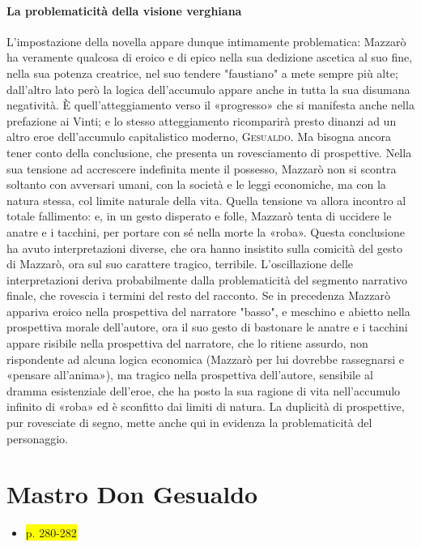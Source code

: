 \documentclass{book}
\newcommand{\pagine}[1]{\colorbox{yellow}{#1}}
\begin{document}
\paragraph{La problematicità della visione verghiana}

L'impostazione della novella appare dunque intimamente problematica: Mazzarò ha veramente qualcosa di eroico e di epico nella sua dedizione ascetica al suo fine, nella sua potenza creatrice, nel suo tendere "faustiano" a mete sempre più alte; dall'altro lato però la logica dell'accumulo appare anche in tutta la sua disumana negatività. È quell'atteggiamento verso il «progresso» che si manifesta anche nella prefazione ai Vinti; e lo stesso atteggiamento ricomparirà presto dinanzi ad un altro eroe dell'accumulo capitalistico moderno, \textsc{Gesualdo}. Ma bisogna ancora tener conto della conclusione, che presenta un rovesciamento di prospettive. Nella sua tensione ad accrescere indefinita mente il possesso, Mazzarò non si scontra soltanto con avversari umani, con la società e le leggi economiche, ma con la natura stessa, col limite naturale della vita. Quella tensione va allora incontro al totale fallimento: e, in un gesto disperato e folle, Mazzarò tenta di uccidere le anatre e i tacchini, per portare con sé nella morte la «roba». Questa conclusione ha avuto interpretazioni diverse, che ora hanno insistito sulla comicità del gesto di Mazzarò, ora sul suo carattere tragico, terribile. L'oscillazione delle interpretazioni deriva probabilmente dalla problematicità del segmento narrativo finale, che rovescia i termini del resto del racconto. Se in precedenza Mazzarò appariva eroico nella prospettiva del narratore "basso", e meschino e abietto nella prospettiva morale dell'autore, ora il suo gesto di bastonare le anatre e i tacchini appare risibile nella prospettiva del narratore, che lo ritiene assurdo, non rispondente ad alcuna logica economica (Mazzarò per lui dovrebbe rassegnarsi e «pensare all'anima»), ma tragico nella prospettiva dell'autore, sensibile al dramma esistenziale dell'eroe, che ha posto la sua ragione di vita nell'accumulo infinito di «roba» ed è sconfitto dai limiti di natura. La duplicità di prospettive, pur rovesciate di segno, mette anche qui in evidenza la problematicità del personaggio.

\section{Mastro Don Gesualdo}

\begin{itemize}
\item
  \pagine{p. 280-282}
\end{itemize}
\end{document}
